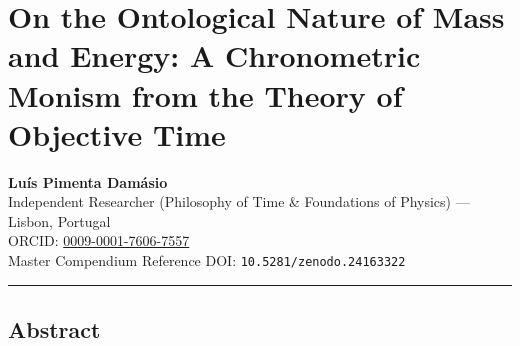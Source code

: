 \documentclass[
]{article}
\author{}
\date{}
\begin{document}
\section{On the Ontological Nature of Mass and Energy: A Chronometric
Monism from the Theory of Objective
Time}\label{on-the-ontological-nature-of-mass-and-energy-a-chronometric-monism-from-the-theory-of-objective-time}

\textbf{Luís Pimenta Damásio}\\
Independent Researcher (Philosophy of Time \& Foundations of Physics)
--- Lisbon, Portugal\\
ORCID:
\href{https://orcid.org/0009-0001-7606-7557}{0009-0001-7606-7557}\\
Master Compendium Reference DOI: \texttt{10.5281/zenodo.24163322}

\begin{center}\rule{0.5\linewidth}{0.5pt}\end{center}

\subsection{Abstract}\label{abstract}
\end{document}
